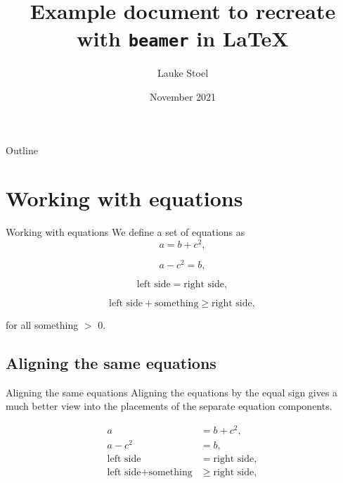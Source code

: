 \documentclass{beamer}
\title{Example document to recreate with \texttt{beamer} in \LaTeX{}}
\author{Lauke Stoel}
\date{\vspace*{-1cm}November 2021}
\institute{\vspace*{-2cm}Markup Languages and Reproducible Programming in Statistics}
\begin{document}
\begin{frame}
\titlepage
\end{frame}

\begin{frame}{Outline}
\tableofcontents %
\end{frame}

\section{Working with equations}
\begin{frame}{Working with equations}
We define a set of equations as
\begin{equation}
a = b+c^2,
\end{equation}

\begin{equation}
a - c^2 = b,
\end{equation}

\begin{equation}
\text{left side} = \text{right side},
\end{equation}

\begin{equation}
\text{left side} + \text{something} \geq \text{right side}, %
\end{equation}

for all something $>$ 0.
\end{frame}

\subsection{Aligning the same equations}
\begin{frame}{Aligning the same equations}
Aligning the equations by the equal sign gives a much better view into the placements
of the separate equation components.

\begin{align} %
a&=b+c^2,\\
a-c^2&=b,\\
\text{left side} &= \text{right side},\\
\text{left side} + \text{something} & \geq \text{right side},
\end{align}

\end{frame}
\end{document}
